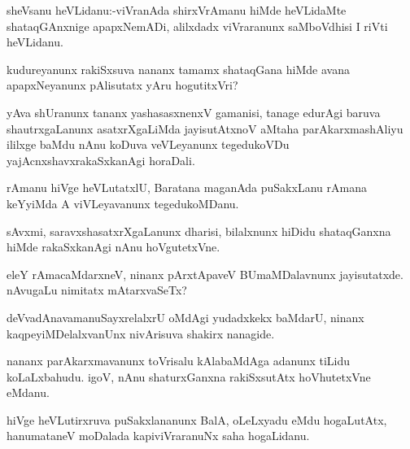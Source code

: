 \documentclass{article}
\begin{document}

\begin{mn}%
sheVsanu heVLidanu:-viVranAda shirxVrAmanu hiMde heVLidaMte shataqGAnxnige apapxNemADi, 
alilxdadx viVraranunx saMboVdhisi I riVti heVLidanu. 
\end{mn}

\begin{mn}%
kudureyanunx rakiSxsuva nananx tamamx shataqGana hiMde avana apapxNeyanunx pAlisutatx yAru 
hogutitxVri?
\end{mn}

\begin{mn}%
yAva shUranunx tananx yashasasxnenxV gamanisi, tanage edurAgi baruva shautrxgaLanunx 
asatxrXgaLiMda jayisutAtxnoV aMtaha parAkarxmashAliyu ililxge baMdu nAnu koDuva 
veVLeyanunx tegedukoVDu yajAcnxshavxrakaSxkanAgi horaDali.
\end{mn}

\begin{mn}%
rAmanu hiVge heVLutatxlU, Baratana maganAda puSakxLanu rAmana keYyiMda A viVLeyavanunx 
tegedukoMDanu.
\end{mn}

\begin{mn}%
sAvxmi, saravxshasatxrXgaLanunx dharisi, bilalxnunx hiDidu shataqGanxna hiMde rakaSxkanAgi 
nAnu hoVgutetxVne.
\end{mn}

\begin{mn}%
eleY rAmacaMdarxneV, ninanx pArxtApaveV BUmaMDalavnunx jayisutatxde. nAvugaLu nimitatx 
mAtarxvaSeTx?
\end{mn}

\begin{mn}%
deVvadAnavamanuSayxrelalxrU oMdAgi yudadxkekx baMdarU, ninanx kaqpeyiMDelalxvanUnx 
nivArisuva shakirx nanagide.
\end{mn}

\begin{mn}%
nananx parAkarxmavanunx toVrisalu kAlabaMdAga adanunx tiLidu koLaLxbahudu. igoV, nAnu 
shaturxGanxna rakiSxsutAtx hoVhutetxVne eMdanu.
\end{mn}

\begin{mn}%
hiVge heVLutirxruva puSakxlananunx BalA, oLeLxyadu eMdu hogaLutAtx, hanumataneV moDalada 
kapiviVraranuNx saha hogaLidanu.
\end{mn}
\end{document}
